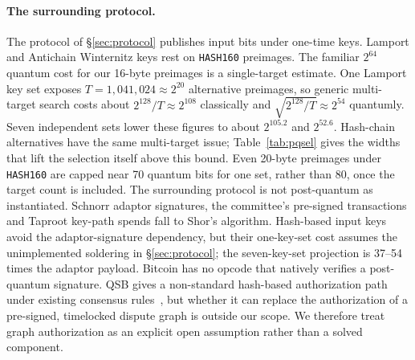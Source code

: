 \documentclass[11pt]{article}
\begin{document}
\paragraph{The surrounding protocol.} The protocol of \S\ref{sec:protocol}
publishes input bits under one-time keys. Lamport and Antichain Winternitz keys
rest on \texttt{HASH160} preimages. The familiar $2^{64}$ quantum cost for our
16-byte preimages is a single-target estimate. One Lamport key set exposes
$T=1{,}041{,}024\approx2^{20}$ alternative preimages, so generic multi-target
search costs about $2^{128}/T\approx2^{108}$ classically and
$\sqrt{2^{128}/T}\approx2^{54}$ quantumly. Seven independent sets lower these
figures to about $2^{105.2}$ and $2^{52.6}$. Hash-chain alternatives have the
same multi-target issue; Table~\ref{tab:pqsel} gives the widths that lift the
selection itself above this bound. Even 20-byte preimages under \texttt{HASH160} are
capped near 70 quantum bits for one set, rather than 80, once the target count
is included.
The surrounding protocol is not post-quantum as instantiated. Schnorr adaptor
signatures, the committee's pre-signed transactions and Taproot key-path spends
fall to Shor's algorithm. Hash-based input keys avoid the adaptor-signature
dependency, but their one-key-set cost assumes the unimplemented soldering in
\S\ref{sec:protocol}; the seven-key-set projection is 37--54 times the
adaptor payload. Bitcoin has no opcode that natively verifies a post-quantum
signature. QSB gives a non-standard hash-based authorization path under
existing consensus rules~\cite{levy26qsb,starkware26qsb}, but whether it can
replace the authorization of a pre-signed, timelocked dispute graph is outside
our scope. We therefore treat graph authorization as an explicit open
assumption rather than a solved component.
\end{document}
